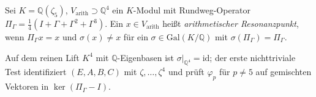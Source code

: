 \begin{definition}
Sei $K=\mathbb{Q}(\zeta_5)$, $V_{\mathrm{arith}}\supset \mathbb{Q}^4$ ein $K$-Modul mit Rundweg-Operator
$\Pi_\Gamma=\frac14(I+\Gamma+\Gamma^2+\Gamma^3)$. Ein $x\in V_{\mathrm{arith}}$ heißt
\emph{arithmetischer Resonanzpunkt}, wenn $\Pi_\Gamma x=x$ und $\sigma(x)\neq x$ für ein
$\sigma\in\mathrm{Gal}(K/\mathbb{Q})$ mit $\sigma(\Pi_\Gamma)=\Pi_\Gamma$.
\end{definition}
\begin{remark}
Auf dem reinen Lift $K^4$ mit $\mathbb{Q}$-Eigenbasen ist $\sigma|_{\mathbb{Q}^4}=\mathrm{id}$;
der erste nichttriviale Test identifiziert $(E,A,B,C)$ mit $\zeta,\ldots,\zeta^4$ und prüft
$\varphi_p$ für $p\neq 5$ auf gemischten Vektoren in $\ker(\Pi_\Gamma-I)$.
\end{remark}
